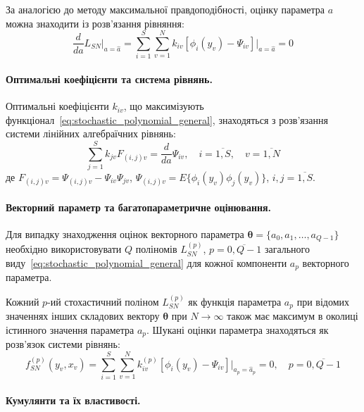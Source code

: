 \documentclass[12pt,a4paper]{article}
\begin{document}
За аналогією до методу максимальної правдоподібності, оцінку параметра $a$ можна знаходити із розв'язання рівняння:
\begin{equation}
\label{eq:pmm_estimation_eq}
\frac{d}{da} L_{SN} \bigg|_{a=\hat{a}} = \sum_{i=1}^{S} \sum_{v=1}^{N} k_{iv} [\phi_i(y_v) - \Psi_{iv}] \bigg|_{a=\hat{a}} = 0
\end{equation}

\paragraph{Оптимальні коефіцієнти та система рівнянь.}

Оптимальні коефіцієнти $k_{iv}$, що максимізують функціонал~\eqref{eq:stochastic_polynomial_general}, знаходяться з розв'язання системи лінійних алгебраїчних рівнянь:
\begin{equation}
\label{eq:optimal_coefficients}
\sum_{j=1}^{S} k_{jv} F_{(i,j)v} = \frac{d}{da} \Psi_{iv}, \quad i=\overline{1,S}, \quad v=\overline{1,N}
\end{equation}
де $F_{(i,j)v} = \Psi_{(i,j)v} - \Psi_{iv} \Psi_{jv}$, $\Psi_{(i,j)v} = E\{\phi_i(y_v)\phi_j(y_v)\}$, $i, j = \overline{1,S}$.

\paragraph{Векторний параметр та багатопараметричне оцінювання.}

Для випадку знаходження оцінок векторного параметра $\boldsymbol{\theta} = \{a_0, a_1, \ldots, a_{Q-1}\}$ необхідно використовувати $Q$ поліномів $L_{SN}^{(p)}$, $p=\overline{0, Q-1}$ загального виду~\eqref{eq:stochastic_polynomial_general} для кожної компоненти $a_p$ векторного параметра.

Кожний $p$-ий стохастичний поліном $L_{SN}^{(p)}$ як функція параметра $a_p$ при відомих значеннях інших складових вектору $\boldsymbol{\theta}$ при $N \to \infty$ також має максимум в околиці істинного значення параметра $a_p$. Шукані оцінки параметра знаходяться як розв'язок системи рівнянь:
\begin{equation}
\label{eq:vector_estimation}
f_{SN}^{(p)}(y_v, x_v) = \sum_{i=1}^{S} \sum_{v=1}^{N} k_{iv}^{(p)} [\phi_i(y_v) - \Psi_{iv}] \bigg|_{a_p=\hat{a}_p} = 0, \quad p=\overline{0,Q-1}
\end{equation}

\paragraph{Кумулянти та їх властивості.}
\end{document}
